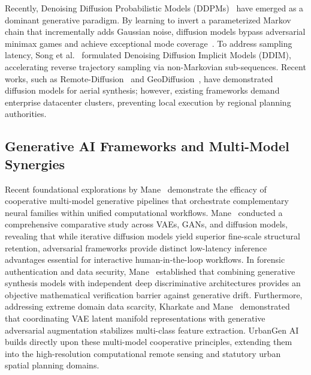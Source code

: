 \documentclass[journal]{IEEEtran}
\begin{document}
Recently, Denoising Diffusion Probabilistic Models (DDPMs)~\cite{sohl2015deep,ho2020denoising} have emerged as a dominant generative paradigm. By learning to invert a parameterized Markov chain that incrementally adds Gaussian noise, diffusion models bypass adversarial minimax games and achieve exceptional mode coverage~\cite{dhariwal2021diffusion}. To address sampling latency, Song et al.~\cite{song2020denoising} formulated Denoising Diffusion Implicit Models (DDIM), accelerating reverse trajectory sampling via non-Markovian sub-sequences. Recent works, such as Remote-Diffusion~\cite{chen2023remote} and GeoDiffusion~\cite{tan2024geodiffusion}, have demonstrated diffusion models for aerial synthesis; however, existing frameworks demand enterprise datacenter clusters, preventing local execution by regional planning authorities.

\subsection{Generative AI Frameworks and Multi-Model Synergies}
Recent foundational explorations by Mane~\cite{mane2026edugen} demonstrate the efficacy of cooperative multi-model generative pipelines that orchestrate complementary neural families within unified computational workflows. Mane~\cite{mane2026colorization} conducted a comprehensive comparative study across VAEs, GANs, and diffusion models, revealing that while iterative diffusion models yield superior fine-scale structural retention, adversarial frameworks provide distinct low-latency inference advantages essential for interactive human-in-the-loop workflows. In forensic authentication and data security, Mane~\cite{mane2026unified} established that combining generative synthesis models with independent deep discriminative architectures provides an objective mathematical verification barrier against generative drift. Furthermore, addressing extreme domain data scarcity, Kharkate and Mane~\cite{kharkate2026skingen} demonstrated that coordinating VAE latent manifold representations with generative adversarial augmentation stabilizes multi-class feature extraction. UrbanGen AI builds directly upon these multi-model cooperative principles, extending them into the high-resolution computational remote sensing and statutory urban spatial planning domains.
\end{document}
